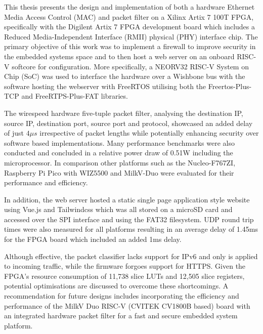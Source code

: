 

%

%





This thesis presents the design and implementation of both a hardware Ethernet Media Access Control (MAC) and packet filter on a Xilinx Artix 7 100T FPGA, specifically with the Digilent Artix 7 FPGA development board which includes a Reduced Media-Independent Interface (RMII) physical (PHY) interface chip. The primary objective of this work was to implement a firewall to improve security in the embedded systems space and to then host a web server on an onboard RISC-V softcore for configuration. More specifically, a NEORV32 RISC-V System on Chip (SoC) was used to interface the hardware over a Wishbone bus with the software hosting the webserver with FreeRTOS utilising both the Freertos-Plus-TCP and FreeRTPS-Plus-FAT libraries. 

The wirespeed hardware five-tuple packet filter, analysing the destination IP, source IP, destination port, source port and protocol, showcased an added delay of just $4\mu s$ irrespective of packet lengths while potentially enhancing security over software based implementations. Many performance benchmarks were also conducted and concluded in a relative power draw of 0.51W including the microprocessor. In comparison other platforms such as the Nucleo-F767ZI, Raspberry Pi Pico with WIZ5500 and MilkV-Duo were evaluated for their performance and efficiency.  

In addition, the web server hosted a static single page application style website using Vue.js and Tailwindcss which was all stored on a microSD card and accessed over the SPI interface and using the FAT32 filesystem. UDP round trip times were also measured for all platforms resulting in an average delay of 1.45ms for the FPGA board which included an added 1ms delay. 

Although effective, the packet classifier lacks support for IPv6 and only is applied to incoming traffic, while the firmware forgoes support for HTTPS. Given the FPGA's resource consumption of 11,738 slice LUTs and 12,505 slice registers, potential optimisations are discussed to overcome these shortcomings. A recommendation for future designs includes incorporating the efficiency and performance of the MilkV Duo RISC-V (CVITEK CV1800B based) board with an integrated hardware packet filter for a fast and secure embedded system platform. 

%